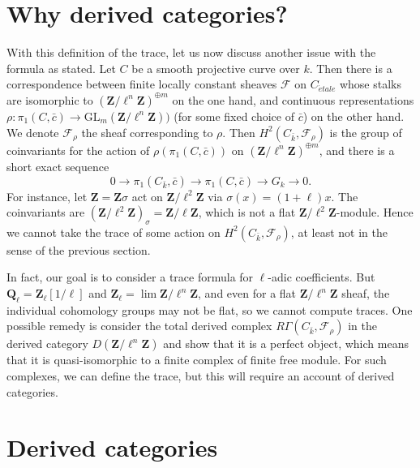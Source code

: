\documentclass{stacks-project}
\theoremstyle{plain}
\theoremstyle{definition}
\theoremstyle{remark}
\numberwithin{equation}{subsection}
\def\lim{\mathop{\mathrm{lim}}\nolimits}
\def\etale{{\acute{e}tale}}
\begin{document}
\section{Why derived categories?}
\label{section-derived-categories-why}

\noindent
With this definition of the trace, let us now discuss another issue with the
formula as stated. Let $C$ be a smooth projective curve over $k$. Then there is
a correspondence between finite locally constant sheaves $\mathcal{F}$ on
$C_\etale$ whose stalks are isomorphic to
${(\mathbf{Z}/\ell^n\mathbf{Z})}^{\oplus m}$ on the one hand, and continuous
representations $\rho : \pi_1 (C, \bar c) \to
\text{GL}_m(\mathbf{Z}/\ell^n\mathbf{Z}))$ (for some fixed choice of $\bar c$)
on the other hand. We denote $\mathcal{F}_\rho$ the sheaf corresponding to
$\rho$. Then $H^2 (C_{\bar k}, \mathcal{F}_\rho)$ is the group of coinvariants
for the action of $\rho(\pi_1 (C, \bar c))$ on
${(\mathbf{Z}/\ell^n\mathbf{Z})}^{\oplus m}$, and there is a short exact
sequence
$$
0 \longrightarrow \pi_1 (C_{\bar k}, \bar c) \longrightarrow \pi_1 (C, \bar c)
\longrightarrow G_k \longrightarrow 0.
$$
For instance, let $\mathbf{Z} = \mathbf{Z} \sigma$ act on
$\mathbf{Z}/\ell^2\mathbf{Z}$ via $\sigma(x) = (1+\ell) x$. The coinvariants
are $(\mathbf{Z}/\ell^2\mathbf{Z})_{\sigma} = \mathbf{Z}/\ell\mathbf{Z}$, which
is not a flat $\mathbf{Z}/\ell^2\mathbf{Z}$-module. Hence we cannot take the
trace of some action on $H^2(C_{\bar k}, \mathcal{F}_\rho)$, at least not in
the sense of the previous section.

\medskip\noindent
In fact, our goal is to consider a trace formula for $\ell$-adic coefficients.
But $\mathbf{Q}_\ell = \mathbf{Z}_\ell[1/\ell]$ and $\mathbf{Z}_\ell =
\lim \mathbf{Z}/\ell^n\mathbf{Z}$, and even for a flat
$\mathbf{Z}/\ell^n\mathbf{Z}$ sheaf, the individual cohomology groups may not
be flat, so we cannot compute traces. One possible remedy is consider the total
derived complex $R\Gamma(C_{\bar k}, \mathcal{F}_\rho)$ in the derived category
$D(\mathbf{Z}/\ell^n\mathbf{Z})$ and show that it is a perfect object, which
means that it is quasi-isomorphic to a finite complex of finite free module.
For such complexes, we can define the trace, but this will require an account
of derived categories.






\section{Derived categories}
\label{section-derived-categories}
\end{document}
